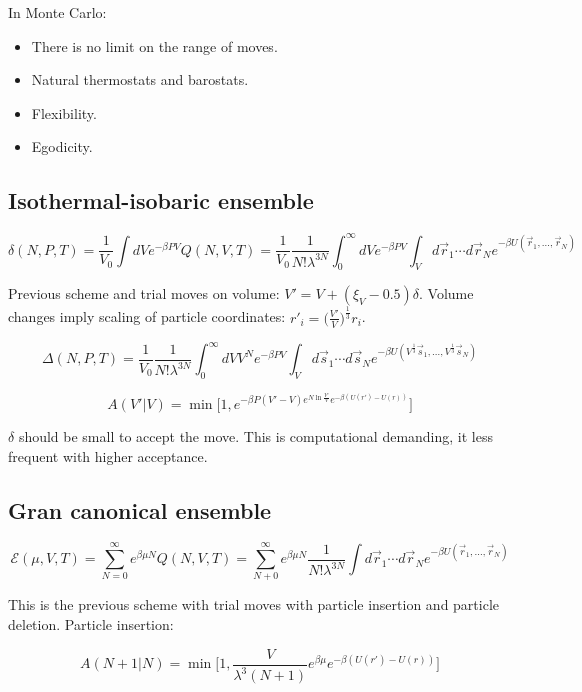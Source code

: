 In Monte Carlo:

\begin{multicols}{2}
	\begin{itemize}
		\item There is no limit on the range of moves.
		\item Natural thermostats and barostats.
		\item Flexibility.
		\item Egodicity.
	\end{itemize}
\end{multicols}

	\subsection{Isothermal-isobaric ensemble}

	$$\delta(N, P, T) = \frac{1}{V_0} \int dVe^{-\beta PV}Q(N, V, T) = \frac{1}{V_0}\frac{1}{N!\lambda^{3N}}\int_0^{\infty}dVe^{-\beta PV}\int_Vd\vec{r}_1\cdots d\vec{r}_Ne^{-\beta U(\vec{r}_1, \dots, \vec{r}_N)}$$

	Previous scheme and trial moves on volume: $V' = V + (\xi_V-0.5)\delta$.
	Volume changes imply scaling of particle coordinates: $r'_i = \biggl(\frac{V'}{V}\biggr)^{\frac{1}{3}}r_i$.

	$$\Delta(N, P, T) = \frac{1}{V_0}\frac{1}{N!\lambda^{3N}}\int_0^{\infty}dVV^Ne^{-\beta PV}\int_Vd\vec{s}_1\cdots d\vec{s}_Ne^{-\beta U(V^{\frac{1}{3}}\vec{s}_1,\dots, V^{\frac{1}{3}}\vec{s}_N)}$$

	$$A(V'|V) = \min\bigl[1, e^{-\beta P(V'-V)e^{N\ln \frac{V'}{V}}e^{-\beta(U(r')-U(r))}}\bigr]$$

	$\delta$ should be small to accept the move.
	This is computational demanding, it less frequent with higher acceptance.

	\subsection{Gran canonical ensemble}

	$$\mathcal{E}(\mu, V, T) = \sum\limits_{N=0}^{\infty}e^{\beta\mu N}Q(N, V, T) = \sum\limits_{N+0}^{\infty}e^{\beta\mu N}\frac{1}{N!\lambda^{3N}}\int d\vec{r}_1\cdots d\vec{r}_Ne^{-\beta U(\vec{r}_1, \dots, \vec{r}_N)}$$

	This is the previous scheme with trial moves with particle insertion and particle deletion.
	Particle insertion:

	$$A(N+1|N) = \min\biggl[1, \frac{V}{\lambda^3(N+1)}e^{\beta\mu}e^{-\beta(U(r')-U(r))}\biggr]$$

